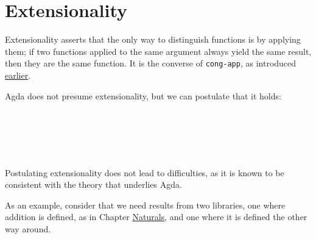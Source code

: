 \hypertarget{Isomorphism-extensionality}{%
\section{Extensionality}\label{Isomorphism-extensionality}}

Extensionality asserts that the only way to distinguish functions is by
applying them; if two functions applied to the same argument always
yield the same result, then they are the same function. It is the
converse of \texttt{cong-app}, as introduced
\protect\hyperlink{Equality-cong}{earlier}.

Agda does not presume extensionality, but we can postulate that it
holds:

\begin{fence}
\begin{code}%
\>[0]\<%
\\
\>[0][@{}l@{\AgdaIndent{0}}]%
\>[2]\AgdaSpace{}%
\AgdaSymbol{:}\AgdaSpace{}%
\AgdaSpace{}%
\AgdaSymbol{\{}\AgdaSpace{}%
\AgdaSpace{}%
\AgdaSymbol{:}\AgdaSpace{}%
\AgdaSymbol{\}}\AgdaSpace{}%
\AgdaSymbol{\{}\AgdaSpace{}%
\AgdaSpace{}%
\AgdaSymbol{:}\AgdaSpace{}%
\AgdaSpace{}%
\AgdaSpace{}%
\AgdaSymbol{\}}\<%
\\
\>[2][@{}l@{\AgdaIndent{0}}]%
\>[4]%
\>[86I]\AgdaSpace{}%
\AgdaSymbol{(}\AgdaSpace{}%
\AgdaSymbol{:}\AgdaSpace{}%
\AgdaSymbol{)}\AgdaSpace{}%
\AgdaSpace{}%
\AgdaSpace{}%
\AgdaSpace{}%
\AgdaSpace{}%
\AgdaSpace{}%
\AgdaSymbol{)}\<%
\\
\>[.][@{}l@{}]\<[86I]%
\>[6]\AgdaComment{-----------------------}\<%
\\
%
\>[4]\AgdaSpace{}%
\AgdaSpace{}%
\AgdaSpace{}%
\<%
\end{code}
\end{fence}

Postulating extensionality does not lead to difficulties, as it is known
to be consistent with the theory that underlies Agda.

As an example, consider that we need results from two libraries, one
where addition is defined, as in Chapter
\protect\hyperlink{Naturals}{Naturals}, and one where it is defined the
other way around.


